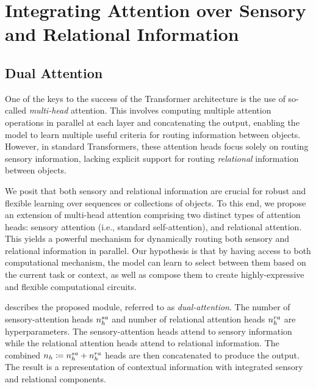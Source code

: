 \section{Integrating Attention over Sensory and Relational Information}

\subsection{Dual Attention}

One of the keys to the success of the Transformer architecture is the use of so-called \textit{multi-head} attention. This involves computing multiple attention operations in parallel at each layer and concatenating the output, enabling the model to learn multiple useful criteria for routing information between objects.  However, in standard Transformers, these attention heads focus solely on routing sensory information, lacking explicit support for routing \textit{relational} information between objects.

We posit that both sensory and relational information are crucial for robust and flexible learning over sequences or collections of objects. To this end, we propose an extension of multi-head attention comprising two distinct types of attention heads: sensory attention (i.e., standard self-attention), and relational attention. This yields a powerful mechanism for dynamically routing both sensory and relational information in parallel. Our hypothesis is that by having access to both computational mechanism, the model can learn to select between them based on the current task or context, as well as compose them to create highly-expressive and flexible computational circuits.

 describes the proposed module, referred to as \textit{dual-attention}. The number of sensory-attention heads $n_h^{sa}$ and number of relational attention heads $n_h^{ra}$ are hyperparameters. The sensory-attention heads attend to sensory information while the relational attention heads attend to relational information. The combined $n_h \coloneq n_h^{sa} + n_h^{ra}$ heads are then concatenated to produce the output. The result is a representation of contextual information with integrated sensory and relational components.

